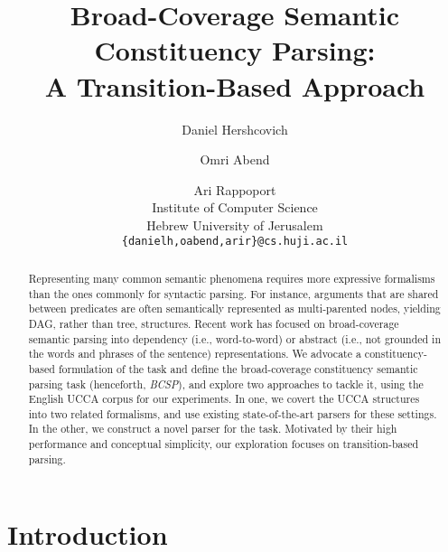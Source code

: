 \documentclass[11pt]{article}
\title{Broad-Coverage Semantic Constituency Parsing: \\
A Transition-Based Approach}
\author{Daniel Hershcovich \and Omri Abend \and Ari Rappoport \\
  Institute of Computer Science \\
  Hebrew University of Jerusalem \\
  {\tt \{danielh,oabend,arir\}@cs.huji.ac.il}
}
\date{}
\begin{document}
\maketitle

\begin{abstract}

  Representing many common semantic phenomena requires more expressive formalisms
  than the ones commonly for syntactic parsing. For instance, arguments that are shared
  between predicates are often semantically represented as multi-parented nodes,
  yielding DAG, rather than tree, structures.
  Recent work has focused on broad-coverage semantic parsing into dependency
  (i.e., word-to-word) or abstract (i.e., not grounded in the words and phrases of the
  sentence) representations.
  We advocate a constituency-based formulation of the task and
  define the broad-coverage constituency semantic parsing task (henceforth, {\it BCSP}),
  and explore two approaches to tackle it, using the English UCCA corpus for our experiments.
  In one, we covert the UCCA structures into two related formalisms, and use existing
  state-of-the-art parsers for these settings.
  In the other, we construct a novel parser for the task.
  Motivated by their high performance and conceptual simplicity,
  our exploration focuses on transition-based parsing.
  
  
\end{abstract}



\section{Introduction}
\end{document}
